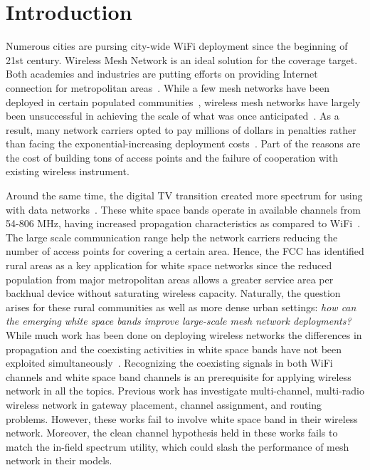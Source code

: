 \section{Introduction}
\label{sec:introduction}


Numerous cities are pursing city-wide WiFi deployment since the 
beginning of 21st century. Wireless Mesh Network is an ideal solution
for the coverage target. Both academies and industries are putting 
efforts on providing Internet connection for metropolitan areas~\cite{pahlavan2011principles}.
While a few mesh networks have been deployed in 
certain populated communities~\cite{CRSK06,google_imc08},
wireless mesh networks have largely been unsuccessful in achieving 
the scale of what was once anticipated~\cite{taps}. 
As a result, many network carriers opted to pay millions of dollars 
in penalties rather than facing the exponential-increasing deployment
 costs~\cite{cnet_aug07}.
Part of the reasons are the cost of building tons of access points 
and the failure of cooperation with existing wireless instrument.

Around the same time, the digital TV transition created more
spectrum for using with data networks~\cite{fccwhitespace}. These white 
space bands operate in available channels from 54-806 MHz, having
increased propagation characteristics as compared to 
WiFi~\cite{balanis2012antenna}. The large scale communication range 
help the network carriers reducing the number of access points for 
covering a certain area. Hence, the FCC has identified rural
areas as a key application for white space networks since the reduced
population from major metropolitan areas allows a greater service area
per backhual device without saturating wireless capacity. 
Naturally, the question arises for these rural communities as well as more dense 
urban settings: {\it how can the emerging white space bands improve 
large-scale mesh network deployments?} 
While much work has been done on deploying wireless networks
the differences in propagation and the coexisting activities in white space bands
have not been exploited simultaneously~\cite{si2010overview}.
Recognizing the coexisting signals in both WiFi channels and white space band channels 
is an prerequisite for applying wireless network in all the topics.
Previous work has investigate multi-channel, multi-radio wireless network in 
gateway placement, channel assignment, and routing problems. However, 
these works fail to involve white space band in their wireless network.
Moreover, the clean channel hypothesis held in these works fails to match the
in-field spectrum utility, which could slash the performance of mesh 
network in their models.

